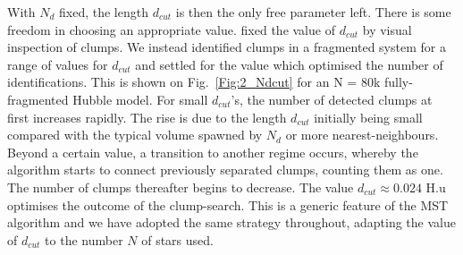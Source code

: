 With $N_d$ fixed, the length $d_{cut}$ is then the only free parameter left. There is some freedom 
in choosing an appropriate value. \cite{Maschberger2010} fixed the value of  $d_{cut}$ by visual inspection of clumps.  We instead  identified  clumps in a fragmented system for a range of values for $d_{cut}$ and settled for the value  which optimised the number of identifications. This is shown on Fig.~\ref{Fig:2_Ndcut} for an N = 80k fully-fragmented Hubble model. For small $d_{cut}$'s, the number of detected clumps at first  increases rapidly. The rise is due  to the length $d_{cut}$ initially being small compared with the typical volume spawned by $N_d$ or more  nearest-neighbours. Beyond a certain value, a transition to another regime occurs, whereby the algorithm starts to connect previously separated clumps, counting them as one. The number of clumps thereafter begins to decrease. The value $d_{cut} \approx 0.024$ H.u optimises the outcome of the clump-search. This is a generic feature of the MST algorithm and we have adopted the same strategy throughout, adapting the value of $d_{cut}$ to the number $N$ of stars used. 


